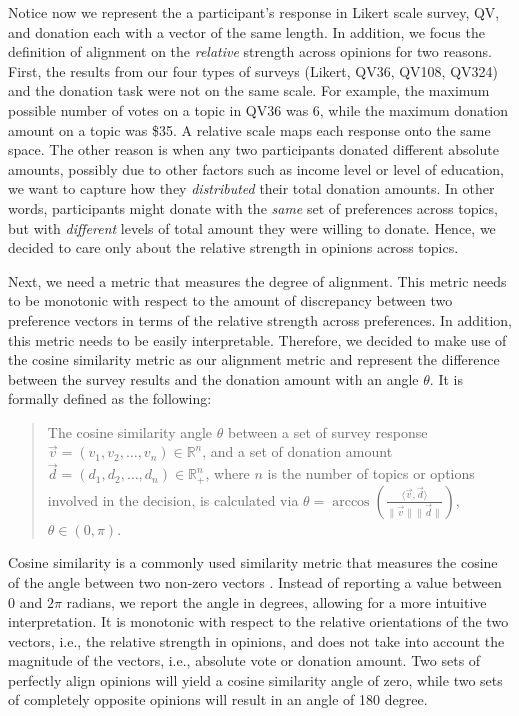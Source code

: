 Notice now we represent the a participant's response in Likert scale survey, QV, and donation each with a vector of the same length. In addition, we focus the definition of alignment on the \textit{relative} strength across opinions for two reasons. First, the results from our four types of surveys (Likert, QV36, QV108, QV324) and the donation task were not on the same scale. For example, the maximum possible number of votes on a topic in QV36 was 6, while the maximum donation amount on a topic was \$35. A relative scale maps each response onto the same space. The other reason is when any two participants donated different absolute amounts, possibly due to other factors such as income level or level of education, we want to capture how they \textit{distributed} their total donation amounts. In other words, participants might donate with the \textit{same} set of preferences across topics, but with \textit{different} levels of total amount they were willing to donate. Hence, we decided to care only about the relative strength in opinions across topics.

Next, we need a metric that measures the degree of alignment. This metric needs to be monotonic with respect to the amount of discrepancy between two preference vectors in terms of the relative strength across preferences. In addition, this metric needs to be easily interpretable. Therefore, we decided to make use of the cosine similarity metric as our alignment metric and represent the difference between the survey results and the donation amount with an angle $\theta$. It is formally defined as the following:

\begin{quote}
    The cosine similarity angle $\theta$ between a set of survey response $\vec{v} = (v_1, v_2,\dots, v_n) \in \mathbb{R}^n$, and a set of donation amount $\vec{d} = (d_1, d_2,\dots, d_n) \in \mathbb{R}_{+}^n$, where $n$ is the number of topics or options involved in the decision, is calculated via $\theta = \arccos \left ( {\frac{\langle \vec{v},  \vec{d} \rangle}{\|\vec{v}\| \|\vec{d}\|}} \right )$, $\theta \in (0, \pi)$.
\end{quote}

Cosine similarity is a commonly used similarity metric 
that measures the cosine of the angle between two non-zero vectors \cite{singhal2001modern}. Instead of reporting a value between $0$ and $2 \pi$ radians, we report the angle in degrees, allowing for a more intuitive interpretation.
It is monotonic with respect to the relative orientations of the two vectors, i.e., the relative strength in opinions, and does not take into account the magnitude of the vectors, i.e., absolute vote or donation amount. Two sets of perfectly align opinions will yield a cosine similarity angle of zero, while two sets of completely opposite opinions will result in an angle of 180 degree.

